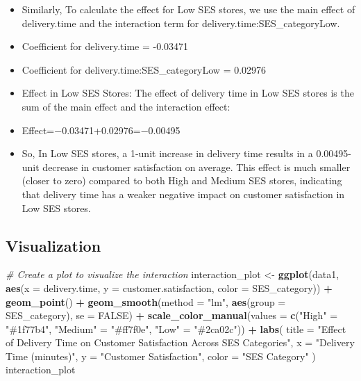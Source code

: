 \documentclass[
]{article}
\newenvironment{Shaded}{\begin{snugshade}}{\end{snugshade}}
\newcommand{\AttributeTok}[1]{\textcolor[rgb]{0.13,0.29,0.53}{#1}}
\newcommand{\CommentTok}[1]{\textcolor[rgb]{0.56,0.35,0.01}{\textit{#1}}}
\newcommand{\ConstantTok}[1]{\textcolor[rgb]{0.56,0.35,0.01}{#1}}
\newcommand{\FunctionTok}[1]{\textcolor[rgb]{0.13,0.29,0.53}{\textbf{#1}}}
\newcommand{\NormalTok}[1]{#1}
\newcommand{\OtherTok}[1]{\textcolor[rgb]{0.56,0.35,0.01}{#1}}
\newcommand{\SpecialCharTok}[1]{\textcolor[rgb]{0.81,0.36,0.00}{\textbf{#1}}}
\newcommand{\StringTok}[1]{\textcolor[rgb]{0.31,0.60,0.02}{#1}}
\providecommand{\tightlist}{%
  \setlength{\itemsep}{0pt}\setlength{\parskip}{0pt}}
\begin{document}
\begin{itemize}
  \begin{itemize}
  \tightlist
  \item
    Similarly, To calculate the effect for Low SES stores, we use the
    main effect of delivery.time and the interaction term for
    delivery.time:SES\_categoryLow.
  \item
    Coefficient for delivery.time = -0.03471
  \item
    Coefficient for delivery.time:SES\_categoryLow = 0.02976
  \item
    Effect in Low SES Stores: The effect of delivery time in Low SES
    stores is the sum of the main effect and the interaction effect:
  \item
    Effect=−0.03471+0.02976=−0.00495
  \item
    So, In Low SES stores, a 1-unit increase in delivery time results in
    a 0.00495-unit decrease in customer satisfaction on average. This
    effect is much smaller (closer to zero) compared to both High and
    Medium SES stores, indicating that delivery time has a weaker
    negative impact on customer satisfaction in Low SES stores.
  \end{itemize}
\end{itemize}

\subsection{Visualization}\label{visualization}

\begin{Shaded}
\begin{Highlighting}[]
\CommentTok{\# Create a plot to visualize the interaction}
\NormalTok{interaction\_plot }\OtherTok{\textless{}{-}} \FunctionTok{ggplot}\NormalTok{(data1, }\FunctionTok{aes}\NormalTok{(}\AttributeTok{x =}\NormalTok{ delivery.time, }\AttributeTok{y =}\NormalTok{ customer.satisfaction, }\AttributeTok{color =}\NormalTok{ SES\_category)) }\SpecialCharTok{+}
  \FunctionTok{geom\_point}\NormalTok{() }\SpecialCharTok{+}
  \FunctionTok{geom\_smooth}\NormalTok{(}\AttributeTok{method =} \StringTok{"lm"}\NormalTok{, }\FunctionTok{aes}\NormalTok{(}\AttributeTok{group =}\NormalTok{ SES\_category), }\AttributeTok{se =} \ConstantTok{FALSE}\NormalTok{) }\SpecialCharTok{+}
  \FunctionTok{scale\_color\_manual}\NormalTok{(}\AttributeTok{values =} \FunctionTok{c}\NormalTok{(}\StringTok{"High"} \OtherTok{=} \StringTok{"\#1f77b4"}\NormalTok{, }\StringTok{"Medium"} \OtherTok{=} \StringTok{"\#ff7f0e"}\NormalTok{, }\StringTok{"Low"} \OtherTok{=} \StringTok{"\#2ca02c"}\NormalTok{)) }\SpecialCharTok{+}
  \FunctionTok{labs}\NormalTok{(}
    \AttributeTok{title =} \StringTok{"Effect of Delivery Time on Customer Satisfaction Across SES Categories"}\NormalTok{,}
    \AttributeTok{x =} \StringTok{"Delivery Time (minutes)"}\NormalTok{,}
    \AttributeTok{y =} \StringTok{"Customer Satisfaction"}\NormalTok{,}
    \AttributeTok{color =} \StringTok{"SES Category"}
\NormalTok{  )}
\NormalTok{interaction\_plot}
\end{Highlighting}
\end{Shaded}
\end{document}
